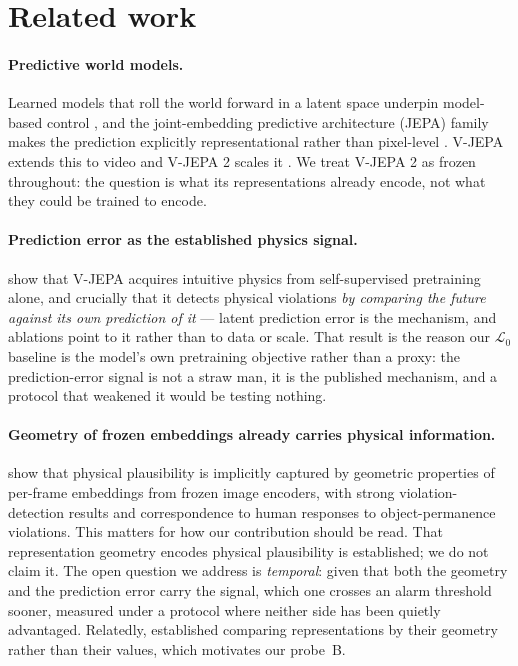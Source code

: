 \section{Related work}

\paragraph{Predictive world models.}
Learned models that roll the world forward in a latent space underpin
model-based control \citep{ha2018world,hafner2020dream}, and the
joint-embedding predictive architecture (JEPA) family makes the prediction
explicitly representational rather than pixel-level
\citep{lecun2022path,assran2023ijepa}. V-JEPA extends this to video
\citep{bardes2024vjepa} and V-JEPA 2 scales it \citep{assran2025vjepa2}. We
treat V-JEPA 2 as frozen throughout: the question is what its representations
already encode, not what they could be trained to encode.

\paragraph{Prediction error as the established physics signal.}
\citet{garrido2025intuitive} show that V-JEPA acquires intuitive physics from
self-supervised pretraining alone, and crucially that it detects physical
violations \emph{by comparing the future against its own prediction of it} ---
latent prediction error is the mechanism, and ablations point to it rather than
to data or scale. That result is the reason our $\mathcal{L}_0$ baseline is the
model's own pretraining objective rather than a proxy: the prediction-error
signal is not a straw man, it is the published mechanism, and a protocol that
weakened it would be testing nothing.

\paragraph{Geometry of frozen embeddings already carries physical information.}
\citet{interno2026geophys} show that physical plausibility is implicitly
captured by geometric properties of per-frame embeddings from frozen image
encoders, with strong violation-detection results and correspondence to human
responses to object-permanence violations. This matters for how our
contribution should be read. That representation geometry encodes physical
plausibility is established; we do not claim it. The open question we address is
\emph{temporal}: given that both the geometry and the prediction error carry
the signal, which one crosses an alarm threshold sooner, measured under a
protocol where neither side has been quietly advantaged. Relatedly,
\citet{kriegeskorte2008rsa} established comparing representations by their
geometry rather than their values, which motivates our probe~B.

